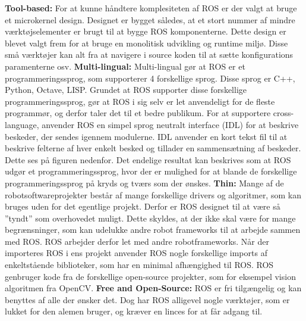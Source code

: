 \textbf{Tool-based:} For at kunne håndtere komplesiteten af ROS er der valgt at bruge et microkernel design. Designet er bygget således, at et stort nummer af mindre værktøjselementer er brugt til at bygge ROS komponenterne. Dette design er blevet valgt frem for at bruge en monolitisk udvikling og runtime miljø. Disse små værktøjer kan alt fra at navigere i source koden til at sætte konfigurations paramenterne osv.\newline
\newline
\textbf{Multi-lingual:} Multi-lingual gør at ROS er et programmeringssprog, som supporterer 4 forskellige sprog. Disse sprog er C++, Python, Octave, LISP. Grundet at ROS supporter disse forskellige programmeringssprog, gør at ROS i sig selv er let anvendeligt for de fleste programmør, og derfor taler det til et bedre publikum. For at supportere cross-language, anvender ROS en simpel sprog neutralt interface (IDL) for at beskrive beskeder, der sendes igennem modulerne. IDL anvender en kort tekst fil til at beskrive felterne af hver enkelt besked og tillader en sammensætning af beskeder. Dette ses på figuren nedenfor.
Det endelige resultat kan beskrives som at ROS udgør et programmeringssprog, hvor der er mulighed for at blande de forskellige programmeringssprog på kryds og tværs som der ønskes. \newline
\newline
\textbf{Thin:} Mange af de robotsoftwareprojekter består af mange forskellige drivers og algoritmer, som kan bruges uden for det egentlige projekt. Derfor er ROS designet til at være så ”tyndt” som overhovedet muligt. Dette skyldes, at der ikke skal være for mange begrænsninger, som kan udelukke andre robot frameworks til at arbejde sammen med ROS. ROS arbejder derfor let med andre robotframeworks. Når der importeres ROS i ens projekt anvender ROS nogle forskellige imports af enkeltstående biblioteker, som har en minimal afhængighed til ROS. ROS genbruger kode fra de forskellige open-source projekter, som for eksempel vision algoritmen fra OpenCV.\newline
\newline
\textbf{Free and Open-Source: }ROS er fri tilgængelig og kan benyttes af alle der ønsker det. Dog har ROS alligevel nogle værktøjer, som er lukket for den alemen bruger, og kræver en linces for at får adgang til. 

